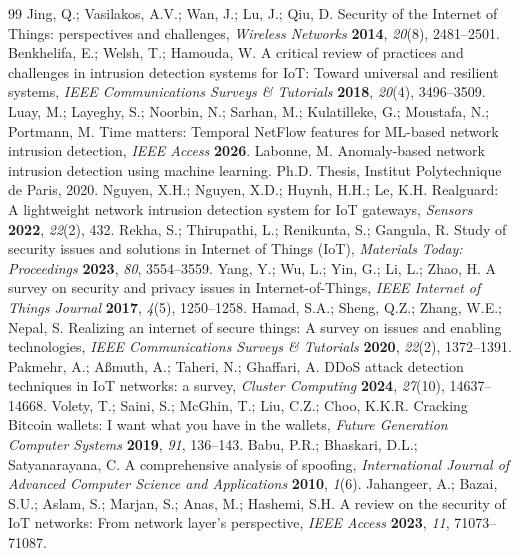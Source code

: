 \documentclass[]{interact}
\theoremstyle{plain}
\theoremstyle{definition}
\begin{document}
\begin{thebibliography}{99}
 Jing, Q.; Vasilakos, A.V.; Wan, J.; Lu, J.; Qiu, D. Security of the Internet of Things: perspectives and challenges, \emph{Wireless Networks} \textbf{2014}, \emph{20}(8), 2481--2501.
 Benkhelifa, E.; Welsh, T.; Hamouda, W. A critical review of practices and challenges in intrusion detection systems for IoT: Toward universal and resilient systems, \emph{IEEE Communications Surveys \& Tutorials} \textbf{2018}, \emph{20}(4), 3496--3509.
 Luay, M.; Layeghy, S.; Noorbin, N.; Sarhan, M.; Kulatilleke, G.; Moustafa, N.; Portmann, M. Time matters: Temporal NetFlow features for ML-based network intrusion detection, \emph{IEEE Access} \textbf{2026}.
 Labonne, M. Anomaly-based network intrusion detection using machine learning. Ph.D. Thesis, Institut Polytechnique de Paris, 2020.
 Nguyen, X.H.; Nguyen, X.D.; Huynh, H.H.; Le, K.H. Realguard: A lightweight network intrusion detection system for IoT gateways, \emph{Sensors} \textbf{2022}, \emph{22}(2), 432.
 Rekha, S.; Thirupathi, L.; Renikunta, S.; Gangula, R. Study of security issues and solutions in Internet of Things (IoT), \emph{Materials Today: Proceedings} \textbf{2023}, \emph{80}, 3554--3559.
 Yang, Y.; Wu, L.; Yin, G.; Li, L.; Zhao, H. A survey on security and privacy issues in Internet-of-Things, \emph{IEEE Internet of Things Journal} \textbf{2017}, \emph{4}(5), 1250--1258.
 Hamad, S.A.; Sheng, Q.Z.; Zhang, W.E.; Nepal, S. Realizing an internet of secure things: A survey on issues and enabling technologies, \emph{IEEE Communications Surveys \& Tutorials} \textbf{2020}, \emph{22}(2), 1372--1391.
 Pakmehr, A.; A{\ss}muth, A.; Taheri, N.; Ghaffari, A. DDoS attack detection techniques in IoT networks: a survey, \emph{Cluster Computing} \textbf{2024}, \emph{27}(10), 14637--14668.
 Volety, T.; Saini, S.; McGhin, T.; Liu, C.Z.; Choo, K.K.R. Cracking Bitcoin wallets: I want what you have in the wallets, \emph{Future Generation Computer Systems} \textbf{2019}, \emph{91}, 136--143.
 Babu, P.R.; Bhaskari, D.L.; Satyanarayana, C. A comprehensive analysis of spoofing, \emph{International Journal of Advanced Computer Science and Applications} \textbf{2010}, \emph{1}(6).
 Jahangeer, A.; Bazai, S.U.; Aslam, S.; Marjan, S.; Anas, M.; Hashemi, S.H. A review on the security of IoT networks: From network layer's perspective, \emph{IEEE Access} \textbf{2023}, \emph{11}, 71073--71087.

\end{thebibliography}
\end{document}
